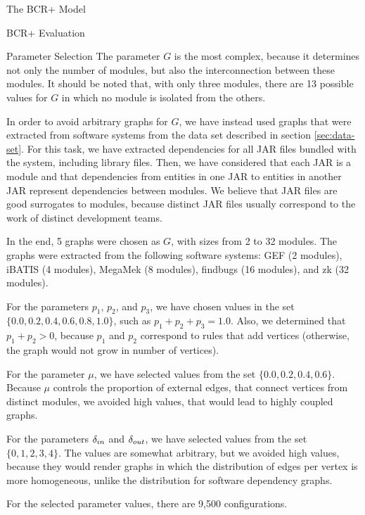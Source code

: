 \documentclass[11pt,twocolumn,a4paper,english]{article}
\begin{document}
\begin{section}{The BCR+ Model}
\begin{subsection}{BCR+ Evaluation}
\begin{subsubsection}{Parameter Selection}
	The parameter $G$ is the most complex, because it determines not only the number of modules, but also the interconnection between these modules. It should be noted that, with only three modules, there are 13 possible values for $G$ in which no module is isolated from the others.
	
	In order to avoid arbitrary graphs for $G$, we have instead used graphs that were extracted from software systems from the data set described in section \ref{sec:data-set}. For this task, we have extracted dependencies for all JAR files bundled with the system, including library files. Then, we have considered that each JAR is a module and that dependencies from entities in one JAR to entities in another JAR represent dependencies between modules. We believe that JAR files are good surrogates to modules, because distinct JAR files usually correspond to the work of distinct development teams.
	
	In the end, 5 graphs were chosen as $G$, with sizes from 2 to 32 modules. The graphs were extracted from the following software systems: GEF (2 modules), iBATIS (4 modules), MegaMek (8 modules), findbugs (16 modules), and zk (32 modules).
	
	For the parameters $p_1$, $p_2$, and $p_3$, we have chosen values in the set $\{0.0, 0.2, 0.4, 0.6, 0.8, 1.0\}$, such as $p_1 + p_2 + p_3 = 1.0$. Also, we determined that $p_1 + p_2 > 0$, because $p_1$ and $p_2$ correspond to rules that add vertices (otherwise, the graph would not grow in number of vertices).
	
	For the parameter $\mu$, we have selected values from the set $\{0.0, 0.2, 0.4, 0.6\}$. Because $\mu$ controls the proportion of external edges, that connect vertices from distinct modules, we avoided high values, that would lead to highly coupled graphs.
	
	For the parameters $\delta_{in}$ and $\delta_{out}$, we have selected values from the set $\{0, 1, 2, 3, 4\}$. The values are somewhat arbitrary, but we avoided high values, because they would render graphs in which the distribution of edges per vertex is more homogeneous, unlike the distribution for software dependency graphs.
	
	For the selected parameter values, there are 9,500 configurations.

\end{subsubsection}


\end{subsection}
\end{section}
\end{document}
